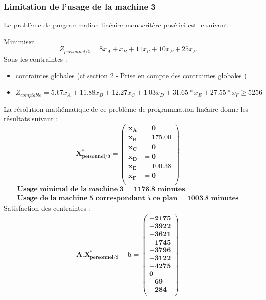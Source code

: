 \documentclass[12pt]{article}
\begin{document}
\subsubsection{Limitation de l'usage de la machine 3}
Le problème de programmation linéaire monocritère posé ici est le suivant :
\begin{tcolorbox}
Minimiser
\begin{equation*}
 Z_{personnel/3}= 8x_{A} + x_{B} + 11x_{C} + 10x_{E} + 25x_{F}
\end{equation*}
Sous les contraintes :
\begin{itemize}
\item contraintes globales (cf section 2 - Prise en compte des contraintes globales )
\item $ Z_{comptable}= 5.67x_{A} +11.88x_{B} +12.27x_{C} +1.03x_{D} +31.65*x_{E} +27.55*x_{F} \geq 5256$
\end{itemize}
\end{tcolorbox}
La résolution mathématique de ce problème de programmation linéaire donne les résultats suivant :\\
\begin{equation*}
\boldsymbol{X^{*}_{personnel/3} = 
   \left (
   \begin{aligned}
      x_{A} &= 0 \\
      x_{B} &= 175.00 \\
      x_{C} &= 0 \\
      x_{D} &= 0 \\
      x_{E} &= 100.38 \\ 
      x_{F} &= 0 \\
   \end{aligned}
   \right )
 } 
\end{equation*}
\begin{align*}
\textbf{Usage minimal de la machine 3 = 1178.8 minutes}\\
\textbf{Usage de la machine 5 correspondant à ce plan = 1003.8 minutes}
\end{align*}
Satisfaction des contraintes : 
\begin{align*}
\boldsymbol{A.X^{*}_{personnel/3} - b = 
   \left (
   \begin{aligned}
      -2175 \\
      -3922 \\
      -3621 \\
      -1745 \\
      -3796 \\
      -3122 \\
      -4275 \\
      0 \\
      -69 \\
      -284\\
   \end{aligned}
   \right )
 } 
\end{align*}
\end{document}
